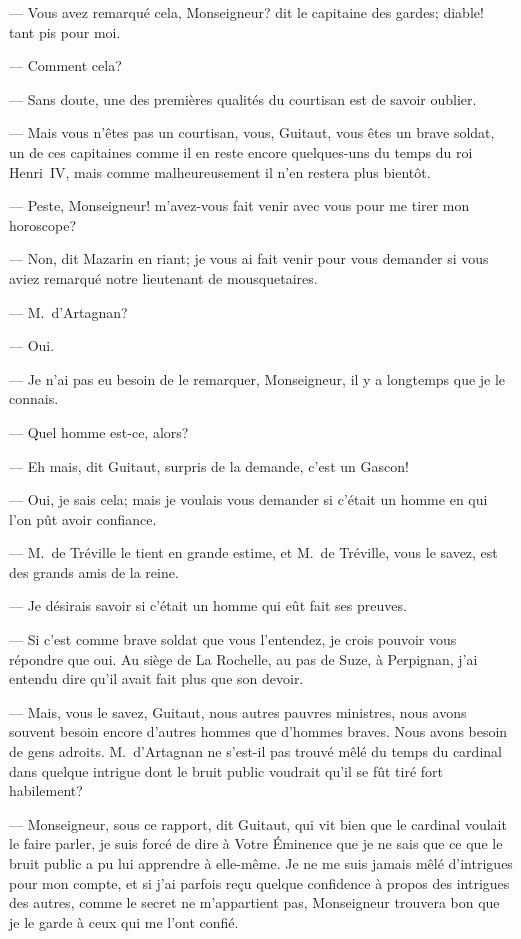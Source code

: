 — Vous avez remarqué cela, Monseigneur? dit le capitaine des gardes; diable! tant pis pour moi.

— Comment cela?

— Sans doute, une des premières qualités du courtisan est de savoir oublier.

— Mais vous n'êtes pas un courtisan, vous, Guitaut, vous êtes un brave soldat, un de ces capitaines comme il en reste encore quelques-uns du temps du roi Henri~IV, mais comme malheureusement il n'en restera plus bientôt.

— Peste, Monseigneur! m'avez-vous fait venir avec vous pour me tirer mon horoscope?

— Non, dit Mazarin en riant; je vous ai fait venir pour vous demander si vous aviez remarqué notre lieutenant de mousquetaires.

— M.~d'Artagnan?

— Oui.

— Je n'ai pas eu besoin de le remarquer, Monseigneur, il y a longtemps que je le connais.

— Quel homme est-ce, alors?

— Eh mais, dit Guitaut, surpris de la demande, c'est un Gascon!

— Oui, je sais cela; mais je voulais vous demander si c'était un homme en qui l'on pût avoir confiance.

— M.~de Tréville le tient en grande estime, et M.~de Tréville, vous le savez, est des grands amis de la reine.

— Je désirais savoir si c'était un homme qui eût fait ses preuves.

— Si c'est comme brave soldat que vous l'entendez, je crois pouvoir vous répondre que oui. Au siège de La Rochelle, au pas de Suze, à Perpignan, j'ai entendu dire qu'il avait fait plus que son devoir.

— Mais, vous le savez, Guitaut, nous autres pauvres ministres, nous avons souvent besoin encore d'autres hommes que d'hommes braves. Nous avons besoin de gens adroits. M.~d'Artagnan ne s'est-il pas trouvé mêlé du temps du cardinal dans quelque intrigue dont le bruit public voudrait qu'il se fût tiré fort habilement?

— Monseigneur, sous ce rapport, dit Guitaut, qui vit bien que le cardinal voulait le faire parler, je suis forcé de dire à Votre Éminence que je ne sais que ce que le bruit public a pu lui apprendre à elle-même. Je ne me suis jamais mêlé d'intrigues pour mon compte, et si j'ai parfois reçu quelque confidence à propos des intrigues des autres, comme le secret ne m'appartient pas, Monseigneur trouvera bon que je le garde à ceux qui me l'ont confié.

